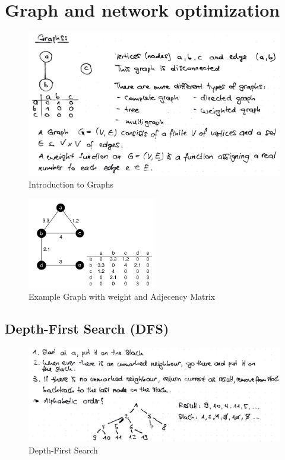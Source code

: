 \section{Graph and network optimization}

\begin{figure}[H]
\centering
\includegraphics[width=1\textwidth]{figures/graphsIntroduction.png}
\caption{Introduction to Graphs}
\end{figure}

\begin{figure}[H]
\centering
\includegraphics[width=0.5\textwidth]{figures/weightedAdjecency.png}
\caption{Example Graph with weight and Adjecency Matrix }
\end{figure}

\subsection{Depth-First Search (DFS)}

\begin{figure}[H]
\centering
\includegraphics[width=1\textwidth]{figures/dfs.png}
\caption{Depth-First Search}
\end{figure}

